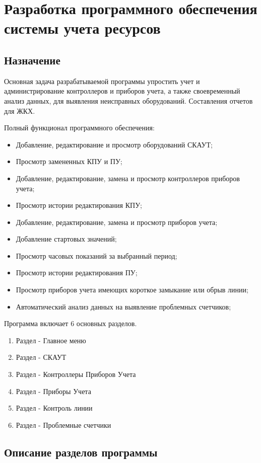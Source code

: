 
\section{Разработка программного обеспечения системы учета ресурсов}
\subsection{Назначение}
Основная задача разрабатываемой программы упростить учет и администрирование контроллеров и приборов учета, а также своевременный анализ данных, для выявления неисправных оборудований. Составления отчетов для ЖКХ.

Полный функционал программного обеспечения:
\begin{itemize}
	\item Добавление, редактирование и просмотр оборудований СКАУТ;
	\item Просмотр замененных КПУ и ПУ;
	\item Добавление, редактирование, замена и просмотр контроллеров приборов учета; 
	\item Просмотр истории редактирования КПУ; 
	\item Добавление, редактирование, замена и просмотр приборов учета; 
	\item Добавление стартовых значений; 
	\item Просмотр часовых показаний за выбранный период; 
	\item Просмотр истории редактирования ПУ;
	\item Просмотр приборов учета имеющих короткое замыкание или обрыв линии;
	\item Автоматический анализ данных на выявление проблемных счетчиков;
\end{itemize}

Программа включает 6 основных разделов.
\begin{enumerate}
	\item Раздел - Главное меню
	\item Раздел - СКАУТ
	\item Раздел - Контроллеры Приборов Учета
	\item Раздел - Приборы Учета
	\item Раздел - Контроль линии
	\item Раздел - Проблемные счетчики
\end{enumerate}

\subsection{Описание разделов программы}
